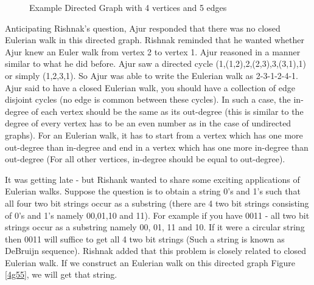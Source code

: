 \begin{figure}
\begin{center}
\caption{ Example Directed Graph with 4 vertices and 5 edges}\label{4g5}
\end{center}
\end{figure}


Anticipating Rishnak's question, Ajur responded that there was no closed Eulerian walk in this directed graph. Rishnak reminded that he wanted whether Ajur knew an Euler walk from vertex 2 to vertex 1. Ajur reasoned in a  manner similar to what he did before. Ajur saw a directed cycle (1,(1,2),2,(2,3),3,(3,1),1) or simply (1,2,3,1). So Ajur was able to write the Eulerian walk as 2-3-1-2-4-1. Ajur said to have a closed Eulerian walk, you should have a collection of edge disjoint cycles (no edge is common between these cycles). In such a case, the in-degree of each vertex should be the same as its out-degree (this is similar to the degree of every vertex has to be an even number as in the case of undirected graphs). For an Eulerian walk, it has to start from a vertex which has one more out-degree than in-degree and end in a vertex which has one more in-degree than out-degree (For all other vertices, in-degree should be equal to out-degree).

It was getting late - but Rishank wanted to share some exciting applications of Eulerian walks. 
Suppose the question is to obtain a string 0's and 1's such that all four two bit strings occur as a substring (there are 4 two bit strings consisting of 0's and 1's namely 00,01,10 and 11). For example if you have 0011 - all two bit strings occur as a substring namely 00, 01, 11 and 10. If it were a circular string then 0011 will suffice to get all 4 two bit strings (Such a string is known as DeBruijn sequence). Rishnak added that this problem is closely related to closed Eulerian walk. If we construct an Eulerian walk on this directed graph Figure \ref{4g55}, we will get that string.

